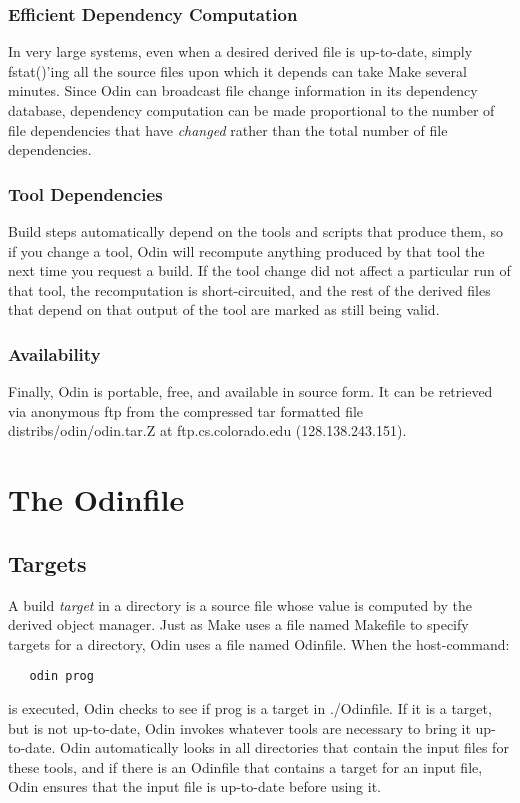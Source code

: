 \subsection{Efficient Dependency Computation}
In very large systems, even when a desired derived file is up-to-date,
simply {\ex fstat()}'ing all the source files upon which it depends
can take Make several minutes.
Since Odin can broadcast file change information in its
dependency database,
dependency computation can be made proportional to the number of
file dependencies that have {\em changed} rather than the total number
of file dependencies.

\subsection{Tool Dependencies}
Build steps automatically depend on the tools and scripts that produce them,
so if you change a tool, Odin will recompute anything produced by that
tool the next time you request a build.
If the tool change did not affect a particular run of that tool,
the recomputation is short-circuited,
and the rest of the derived files 
that depend on that output of the tool are marked as still being valid.

\subsection{Availability}
Finally, Odin is portable, free, and available in source form.
It can be retrieved via anonymous ftp
from the compressed tar formatted file {\ex distribs/odin/odin.tar.Z}
at {\ex ftp.cs.colorado.edu (128.138.243.151)}.


\chapter{The Odinfile}
\label{odinfile}


\section{Targets}
\label{target}

A build {\em target} in a directory is
a source file whose value is computed by the derived object manager.
Just as Make uses a file named {\ex Makefile} to specify targets
for a directory, Odin uses a file named {\ex Odinfile}.
When the host-command:
\begin{verbatim}
   odin prog
\end{verbatim}
is executed, Odin checks to see if {\ex prog} is a target
in {\ex ./Odinfile}.
If it is a target, but is not up-to-date,
Odin invokes whatever tools are necessary to bring it up-to-date.
Odin automatically looks in all directories that
contain the input files for these tools,
and if there is an {\ex Odinfile}
that contains a target for an input file,
Odin ensures that the input file is up-to-date before using it.

